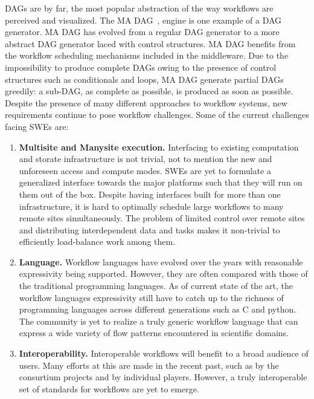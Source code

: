 DAGs are by far, the most popular abstraction of the way workflows are
perceived and visualized. The MA DAG~\cite{caron-desprez:2005}, engine is one
example of a DAG generator. MA DAG has evolved from a regular DAG
generator to a more abstract DAG generator laced with control structures. MA
DAG benefits from the workflow scheduling mechanisms included in the
middleware. Due to the impossibility to produce complete DAGs owing to the
presence of control structures such as conditionals and loops, MA DAG generate
partial DAGs greedily: a sub-DAG, as complete as possible, is produced as soon
as possible. Despite the presence of many different approaches to workflow
systems, new requirements continue to pose workflow challenges. Some of the
current challenges facing SWEs are:

\begin{enumerate}
\item \textbf{Multisite and Manysite execution.} Interfacing to existing computation and
storate infrastructure is not trivial, not to mention the new and unforeseen
access and compute modes. SWEs are yet to formulate a generalized interface
towards the major platforms such that they will run on them out of the box.
Despite having interfaces built for more than one infrastructure, it is hard to
optimally schedule large workflows to many remote sites simultaneously. The
problem of limited control over remote sites and distributing interdependent
data and tasks makes it non-trivial to efficiently load-balance work among
them.

\item \textbf{Language.} Workflow languages have evolved over the years
with reasonable expressivity being supported. However, they are often
compared with those of the traditional programming languages. As of
current state of the art, the workflow languages expressivity still
have to catch up to the richness of programming languages across
different generations such as C and python.  The community is yet to
realize a truly generic workflow language that can express a wide
variety of flow patterns encountered in scientific domains.

\item \textbf{Interoperability.} Interoperable workflows will benefit to a
broad audience of users. Many efforts at this are made in the recent
past, such as by the consurtium projects and by individual players.
However, a truly interoperable set of standards for workflows are yet
to emerge.
\end{enumerate}
